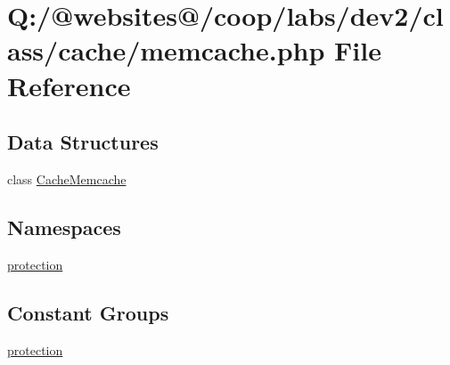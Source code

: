 \hypertarget{memcache_8php}{\section{Q\-:/@websites@/coop/labs/dev2/class/cache/memcache.php File Reference}
\label{memcache_8php}
}
\subsection*{Data Structures}
\begin{DoxyCompactItemize}
\item 
class \hyperlink{class_cache_memcache}{Cache\-Memcache}
\end{DoxyCompactItemize}
\subsection*{Namespaces}
\begin{DoxyCompactItemize}
\item 
\hyperlink{namespaceprotection}{protection}
\end{DoxyCompactItemize}
\subsection*{Constant Groups}
\begin{DoxyCompactItemize}
\item 
\hyperlink{namespaceprotection}{protection}
\end{DoxyCompactItemize}
